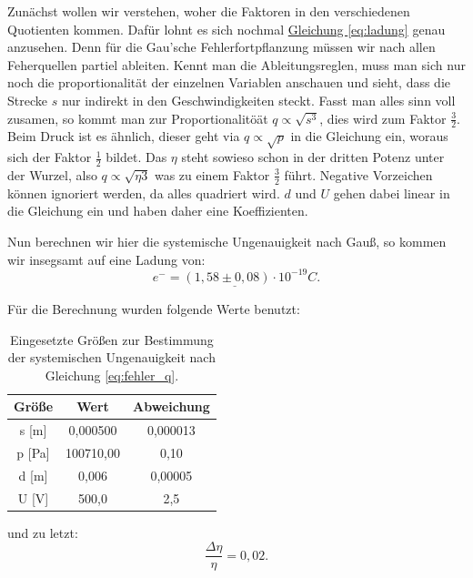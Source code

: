 Zunächst wollen wir verstehen, woher die Faktoren in den verschiedenen Quotienten kommen. Dafür lohnt es sich nochmal \hyperref[eq:ladung]{Gleichung \ref*{eq:ladung}} genau anzusehen. Denn für die Gau'sche Fehlerfortpflanzung müssen wir nach allen Feherquellen partiel ableiten. 
Kennt man die Ableitungsreglen, muss man sich nur noch die proportionalität der einzelnen Variablen anschauen und sieht, dass die Strecke $s$ nur indirekt in den Geschwindigkeiten steckt. Fasst man alles sinn voll zusamen, so kommt man zur Proportionalitöät $q \propto \sqrt{s^3}$, dies wird zum Faktor $\frac{3}{2}$.
Beim Druck ist es ähnlich, dieser geht via $q \propto \sqrt{p}$ in die Gleichung ein, woraus sich der Faktor $\frac{1}{2}$ bildet.
Das $\eta$ steht sowieso schon in der dritten Potenz unter der Wurzel, also $q \propto \sqrt{\eta 3}$ was zu einem Faktor $\frac{3}{2}$ führt.
Negative Vorzeichen können ignoriert werden, da alles quadriert wird. $d$ und $U$ gehen dabei linear in die Gleichung ein und haben daher eine Koeffizienten. 

Nun berechnen wir hier die systemische Ungenauigkeit nach Gauß, so kommen wir insegsamt auf eine Ladung von:
\begin{equation}
    \underline{e^- = (1,58 \pm 0,08) \cdot 10^{-19}C}.
\end{equation}

Für die Berechnung wurden folgende Werte benutzt:
\begin{table}
    \centering
    \begin{tabular}{c | c | c}
        \toprule
        Größe & Wert & Abweichung \\
        \hline
        s [m] & 0,000500 & 0,000013 \\
        p [Pa] & 100710,00 &  0,10 \\ 
        d [m] & 0,006 & 0,00005 \\
        U [V] & 500,0 & 2,5 \\
        \bottomrule
    \end{tabular}
    \caption{Eingesetzte Größen zur Bestimmung der systemischen Ungenauigkeit nach Gleichung \ref*{eq:fehler_q}.}
\end{table}

und zu letzt:
\begin{equation}
    \frac{\Delta \eta}{\eta} = 0,02.
\end{equation}

